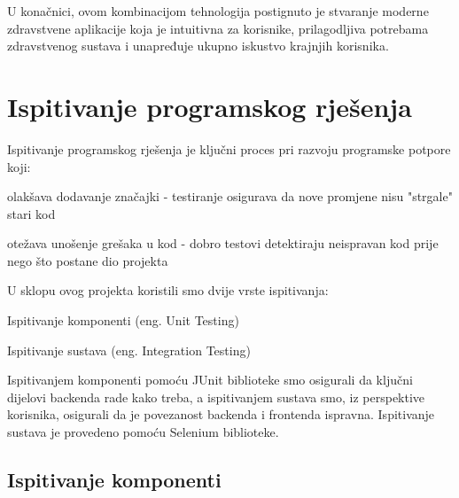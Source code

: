 			 U konačnici, ovom kombinacijom tehnologija postignuto je stvaranje moderne zdravstvene aplikacije koja je intuitivna za korisnike, prilagodljiva potrebama zdravstvenog sustava i unapređuje ukupno iskustvo krajnjih korisnika.
			\eject 
	
		\section{Ispitivanje programskog rješenja}
			Ispitivanje programskog rješenja je ključni proces pri razvoju programske potpore koji:
			\begin{packed_item}
				\item olakšava dodavanje značajki - testiranje osigurava da nove promjene nisu "strgale" stari kod
				\item otežava unošenje grešaka u kod - dobro testovi detektiraju neispravan kod prije nego što postane dio projekta
			\end{packed_item}
			
			U sklopu ovog projekta koristili smo dvije vrste ispitivanja:
			\begin{packed_item}
				\item Ispitivanje komponenti (eng. Unit Testing)
				\item Ispitivanje sustava (eng. Integration Testing)
			\end{packed_item}
			
			Ispitivanjem komponenti pomoću JUnit biblioteke smo osigurali da ključni dijelovi backenda rade kako treba, a ispitivanjem sustava smo, iz perspektive korisnika, osigurali da je povezanost backenda i frontenda ispravna. 
			Ispitivanje sustava je provedeno pomoću Selenium biblioteke.
			
			\subsection{Ispitivanje komponenti}
			
